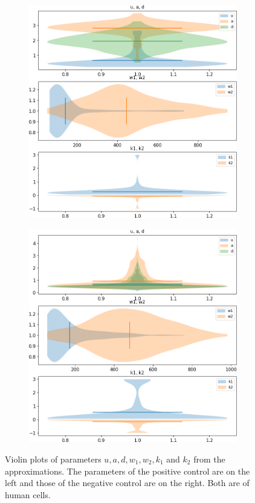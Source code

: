 \begin{figure}[h]
	\centering
	\begin{subfigure}{0.45\linewidth}
		\includegraphics[width=\textwidth]{fig/parameter_violin_plot_human_pos}
	\end{subfigure}
	\hfill
	\begin{subfigure}{0.45\linewidth}
		\includegraphics[width=\textwidth]{fig/parameter_violin_plot_human_neg}
	\end{subfigure}
	
	\caption{Violin plots of parameters $u, a, d, w_1, w_2, k_1$ and $k_2$ from the approximations. The parameters of the positive control are on the left and those of the negative control are on the right. Both are of human cells.}
	\label{fig:parameter_violin_plot}
\end{figure}

